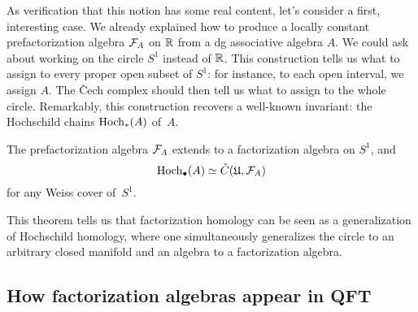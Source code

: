 \documentclass[11pt]{amsart}
\def\owen#1{{\textcolor{violet!65!black}{OG: {#1}}}}
\begin{document}
As verification that this notion has some real content, let's consider a first, interesting case.
We already explained how to produce a locally constant prefactorization algebra $\mathcal F_A$ on $\mathbb R$ from a dg associative algebra $A$.
We could ask about working on the circle $S^1$ instead of $\mathbb R$.
This construction tells us what to assign to every proper open subset of $S^1$: for instance, to each open interval, we assign $A$.
The \v{C}ech complex should then tell us what to assign to the whole circle.
Remarkably, this construction recovers a well-known invariant: the Hochschild chains ${\rm Hoch}_*(A)$ of~$A$.

\begin{thm}[\owen{citations}]
The prefactorization algebra $\mathcal F_A$ extends to a factorization algebra on $S^1$, and
\[
{\rm Hoch}_\bullet(A) \simeq \check{C}(\mathfrak{U},\mathcal F_A)
\]
for any Weiss cover of~$S^1$.
\end{thm}

This theorem tells us that factorization homology can be seen as a generalization of Hochschild homology,
where one simultaneously generalizes the circle to an arbitrary closed manifold and an algebra to a factorization algebra.

%

\subsection{How factorization algebras appear in QFT}
\end{document}
